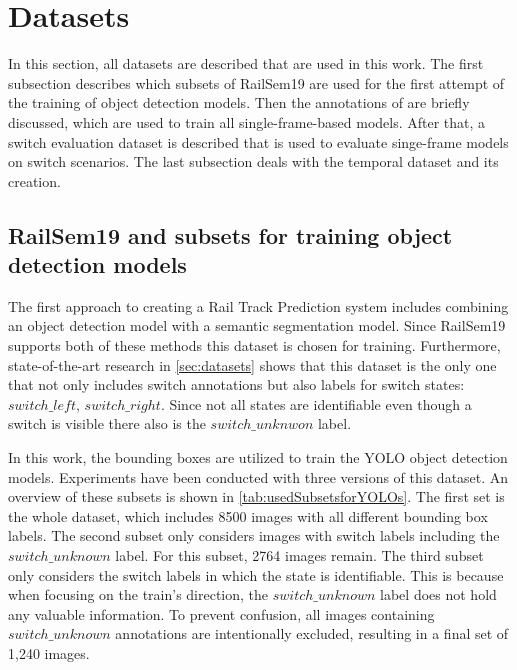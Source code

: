 \section{Datasets}
\label{sec:usedDatasets}

In this section, all datasets are described that are used in this work.
The first subsection describes which subsets of RailSem19 are used for the first attempt of the training of object detection models.
Then the annotations of \cite{tepNet2024} are briefly discussed, which are used to train all single-frame-based models.
After that, a switch evaluation dataset is described that is used to evaluate singe-frame models on switch scenarios.
The last subsection deals with the temporal dataset and its creation.


\subsection{RailSem19 and subsets for training object detection models}
\label{sec:usedDatasetsYOLOs}

The first approach to creating a Rail Track Prediction system includes combining an object detection model with a semantic segmentation model.
Since RailSem19 supports both of these methods this dataset is chosen for training.
Furthermore, state-of-the-art research in \autoref{sec:datasets} shows that this dataset is the only one that not only includes switch annotations but also labels for switch states: $switch\_left$, $switch\_right$.
Since not all states are identifiable even though a switch is visible there also is the $switch\_unknwon$ label.

In this work, the bounding boxes are utilized to train the \ac{YOLO} object detection models.
Experiments have been conducted with three versions of this dataset.
An overview of these subsets is shown in \autoref{tab:usedSubsetsforYOLOs}.
The first set is the whole dataset, which includes 8500 images with all different bounding box labels.
The second subset only considers images with switch labels including the $switch\_unknown$ label.
For this subset, 2764 images remain. The third subset only considers the switch labels in which the state is identifiable.
This is because when focusing on the train's direction, the $switch\_unknown$ label does not hold any valuable information.
To prevent confusion, all images containing $switch\_unknown$ annotations are intentionally excluded, resulting in a final set of 1,240 images.


